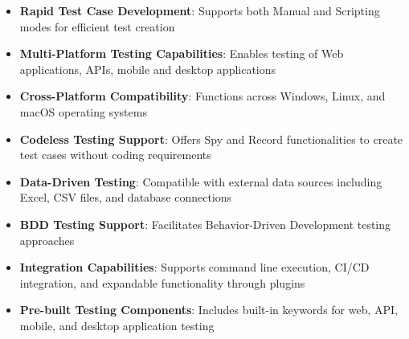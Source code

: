 \begin{itemize}
    \item \textbf{Rapid Test Case Development}: Supports both Manual and Scripting modes for efficient test creation
    \item \textbf{Multi-Platform Testing Capabilities}: Enables testing of Web applications, APIs, mobile and desktop applications
    \item \textbf{Cross-Platform Compatibility}: Functions across Windows, Linux, and macOS operating systems
    \item \textbf{Codeless Testing Support}: Offers Spy and Record functionalities to create test cases without coding requirements
    \item \textbf{Data-Driven Testing}: Compatible with external data sources including Excel, CSV files, and database connections
    \item \textbf{BDD Testing Support}: Facilitates Behavior-Driven Development testing approaches
    \item \textbf{Integration Capabilities}: Supports command line execution, CI/CD integration, and expandable functionality through plugins
    \item \textbf{Pre-built Testing Components}: Includes built-in keywords for web, API, mobile, and desktop application testing
\end{itemize}

